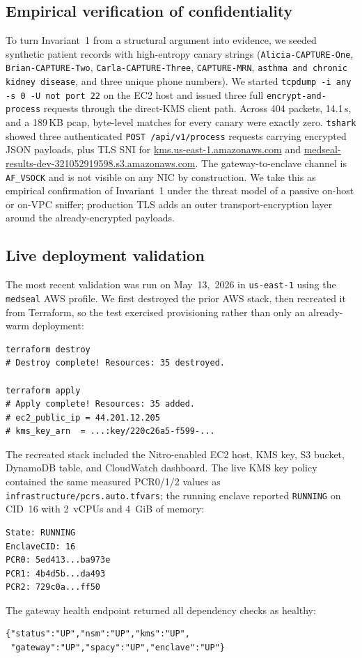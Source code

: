 \documentclass[11pt]{article}
\begin{document}
\subsection{Empirical verification of confidentiality}\label{sec:netproof}

To turn Invariant~1 from a structural argument into evidence, we
seeded synthetic patient records with high-entropy canary strings
(\texttt{Alicia-CAPTURE-One}, \texttt{Brian-CAPTURE-Two},
\texttt{Carla-CAPTURE-Three}, \texttt{CAPTURE-MRN},
\texttt{asthma and chronic kidney disease}, and three unique phone
numbers). We started \texttt{tcpdump -i any -s 0 -U not port 22} on
the EC2 host and issued three full
\texttt{encrypt-and-process} requests through the direct-KMS client
path. Across 404 packets, 14.1\,s, and a 189\,KB pcap, byte-level
matches for every canary were exactly zero. \texttt{tshark} showed
three authenticated \texttt{POST /api/v1/process} requests carrying
encrypted JSON payloads, plus TLS SNI for
\url{kms.us-east-1.amazonaws.com} and
\url{medseal-results-dev-321052919598.s3.amazonaws.com}. The
gateway-to-enclave channel is \texttt{AF\_VSOCK} and is not visible
on any NIC by construction. We take this as empirical confirmation
of Invariant~1 under the threat model of a passive on-host or
on-VPC sniffer; production TLS adds an outer transport-encryption
layer around the already-encrypted payloads.

\subsection{Live deployment validation}

The most recent validation was run on May~13,~2026 in
\texttt{us-east-1} using the \texttt{medseal} AWS profile. We first
destroyed the prior AWS stack, then recreated it from Terraform, so the
test exercised provisioning rather than only an already-warm
deployment:
\begin{verbatim}
terraform destroy
# Destroy complete! Resources: 35 destroyed.

terraform apply
# Apply complete! Resources: 35 added.
# ec2_public_ip = 44.201.12.205
# kms_key_arn  = ...:key/220c26a5-f599-...
\end{verbatim}
The recreated stack included the Nitro-enabled EC2 host, KMS key, S3
bucket, DynamoDB table, and CloudWatch dashboard. The live KMS key
policy contained the same measured PCR0/1/2 values as
\texttt{infrastructure/pcrs.auto.tfvars}; the running enclave reported
\texttt{RUNNING} on CID~16 with 2~vCPUs and 4~GiB of memory:
\begin{verbatim}
State: RUNNING
EnclaveCID: 16
PCR0: 5ed413...ba973e
PCR1: 4b4d5b...da493
PCR2: 729c0a...ff50
\end{verbatim}
The gateway health endpoint returned all dependency checks as healthy:
\begin{verbatim}
{"status":"UP","nsm":"UP","kms":"UP",
 "gateway":"UP","spacy":"UP","enclave":"UP"}
\end{verbatim}
\end{document}
